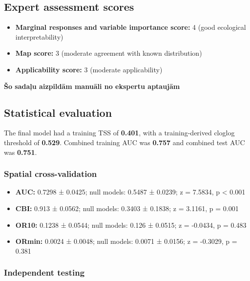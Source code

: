 \documentclass[
  openany]{book}
\providecommand{\tightlist}{%
  \setlength{\itemsep}{0pt}\setlength{\parskip}{0pt}}
\providecommand{\tightlist}{%
  \setlength{\itemsep}{0pt}%
  \setlength{\parskip}{0pt}%
}
\begin{document}
\subsection*{Expert assessment scores}\label{expert-assessment-scores-9}

\begin{itemize}
\tightlist
\item
  \textbf{Marginal responses and variable importance score:} 4 (good ecological interpretability)
\item
  \textbf{Map score:} 3 (moderate agreement with known distribution)
\item
  \textbf{Applicability score:} 3 (moderate applicability)
\end{itemize}

\textbf{Šo sadaļu aizpildām manuāli no ekspertu aptaujām}

\subsection*{Statistical evaluation}\label{statistical-evaluation-9}

The final model had a training TSS of \textbf{0.401}, with a training-derived cloglog threshold of \textbf{0.529}. Combined training AUC was \textbf{0.757} and combined test AUC was \textbf{0.751}.

\subsubsection*{Spatial cross-validation}\label{spatial-cross-validation-9}

\begin{itemize}
\tightlist
\item
  \textbf{AUC:} 0.7298 ± 0.0425; null models: 0.5487 ± 0.0239; z = 7.5834, p \textless{} 0.001
\item
  \textbf{CBI:} 0.913 ± 0.0562; null models: 0.3403 ± 0.1838; z = 3.1161, p = 0.001
\item
  \textbf{OR10:} 0.1238 ± 0.0544; null models: 0.126 ± 0.0515; z = -0.0434, p = 0.483
\item
  \textbf{ORmin:} 0.0024 ± 0.0048; null models: 0.0071 ± 0.0156; z = -0.3029, p = 0.381
\end{itemize}

\subsubsection*{Independent testing}\label{independent-testing-9}
\end{document}
